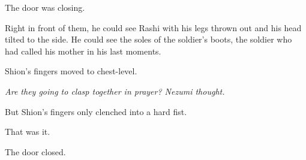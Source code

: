 The door was closing.

Right in front of them, he could see Rashi with his legs thrown out and
his head tilted to the side. He could see the soles of the soldier's
boots, the soldier who had called his mother in his last moments.

Shion's fingers moved to chest-level.

\emph{Are they going to clasp together in prayer? Nezumi thought.}

But Shion's fingers only clenched into a hard fist.

That was it.

The door closed.